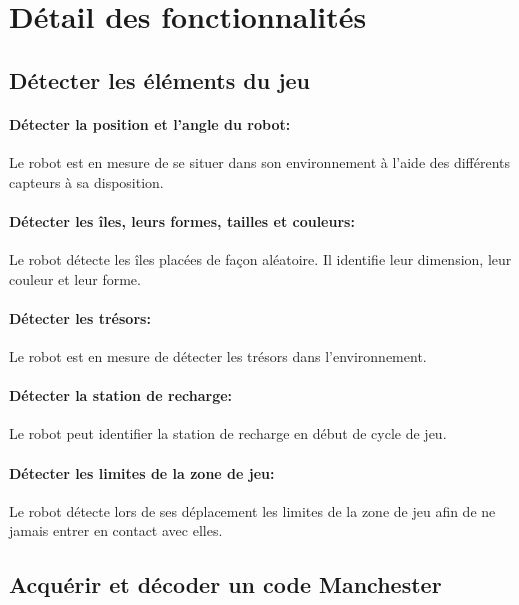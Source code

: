 \section{Détail des fonctionnalités}

\subsection{Détecter les éléments du jeu}

\paragraph{Détecter la position et l'angle du robot:}

Le robot est en mesure de se situer dans son environnement à l'aide des différents capteurs à sa disposition.

\paragraph{Détecter les îles, leurs formes, tailles et couleurs:}

Le robot détecte les îles placées de façon aléatoire. Il identifie leur dimension, leur couleur et leur forme.

\paragraph{Détecter les trésors:}

Le robot est en mesure de détecter les trésors dans l'environnement.

\paragraph{Détecter la station de recharge:}

Le robot peut identifier la station de recharge en début de cycle de jeu.

\paragraph{Détecter les limites de la zone de jeu:}

Le robot détecte lors de ses déplacement les limites de la zone de jeu afin de ne jamais entrer en contact avec elles.

\subsection{Acquérir et décoder un code Manchester}

